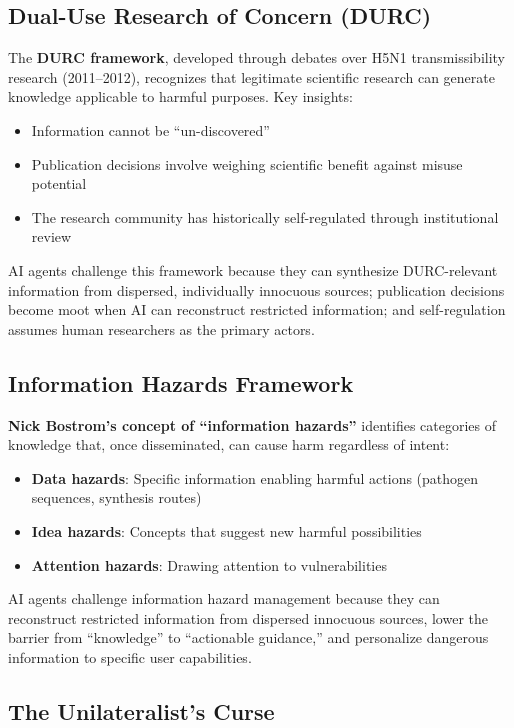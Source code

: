 \documentclass[11pt,letterpaper]{article}
\begin{document}
\subsection{Dual-Use Research of Concern (DURC)}

The \textbf{DURC framework}, developed through debates over H5N1 transmissibility research (2011--2012), recognizes that legitimate scientific research can generate knowledge applicable to harmful purposes. Key insights:
\begin{itemize}[nosep]
  \item Information cannot be ``un-discovered''
  \item Publication decisions involve weighing scientific benefit against misuse potential
  \item The research community has historically self-regulated through institutional review
\end{itemize}

AI agents challenge this framework because they can synthesize DURC-relevant information from dispersed, individually innocuous sources; publication decisions become moot when AI can reconstruct restricted information; and self-regulation assumes human researchers as the primary actors.

\subsection{Information Hazards Framework}

\textbf{Nick Bostrom's concept of ``information hazards''} identifies categories of knowledge that, once disseminated, can cause harm regardless of intent:
\begin{itemize}[nosep]
  \item \textbf{Data hazards}: Specific information enabling harmful actions (pathogen sequences, synthesis routes)
  \item \textbf{Idea hazards}: Concepts that suggest new harmful possibilities
  \item \textbf{Attention hazards}: Drawing attention to vulnerabilities
\end{itemize}

AI agents challenge information hazard management because they can reconstruct restricted information from dispersed innocuous sources, lower the barrier from ``knowledge'' to ``actionable guidance,'' and personalize dangerous information to specific user capabilities.

\subsection{The Unilateralist's Curse}
\end{document}
